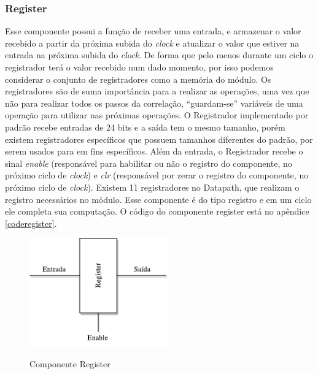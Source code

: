 \subsubsection{Register}
Esse componente possui a função de receber uma entrada, e armazenar o valor recebido a partir da próxima subida do \textit{clock} e atualizar o valor que estiver na entrada na próxima subida do \textit{clock}. De forma que pelo menos durante um ciclo o registrador terá o valor recebido num dado momento, por isso podemos considerar o conjunto de registradores como a memória do módulo. Os registradores são de suma importância para a realizar as operações, uma vez que não para realizar todos os passos da correlação, “guardam-se” variáveis de uma operação para utilizar nas próximas operações. O Registrador implementado por padrão recebe entradas de 24 bits e a saída tem o mesmo tamanho, porém existem registradores específicos que possuem tamanhos diferentes do padrão, por serem usados para em fins específicos. Além da entrada, o Registrador recebe o sinal \textit{enable} (responsável para habilitar ou não o registro do componente, no próximo ciclo de \textit{clock}) e \textit{clr} (responsável por zerar o registro do componente, no próximo ciclo de \textit{clock}). Existem 11 registradores no Datapath, que realizam o registro necessários no módulo. Esse componente é do tipo registro e em um ciclo ele completa sua computação. O código do componente register está no apêndice \ref{coderegister}.

\begin{figure}[H]
	\centering
	\includegraphics[width=6cm]{figures/Register.pdf}\\
	\caption{Componente Register}
	\label{register}
\end{figure}

